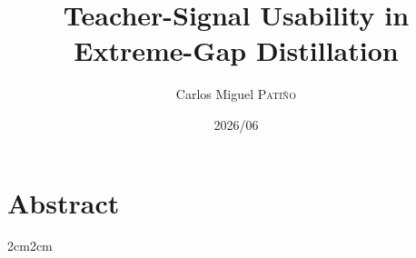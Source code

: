 \documentclass{mscaithesis}  %
\title{Teacher-Signal Usability in\\ Extreme-Gap Distillation}
\date{2026/06}
\author{Carlos Miguel \textsc{Patiño}}
\begin{document}
\maketitle

\frontmatter
        \chapter*{Abstract}
                \begin{adjustwidth}{2cm}{2cm}
                        
                \end{adjustwidth}

\tableofcontents

\listoffigures

\listoftables

\setlength{\parskip}{5pt}




\mainmatter
        
        
        
        
        
        




\appendix
        
\end{document}
